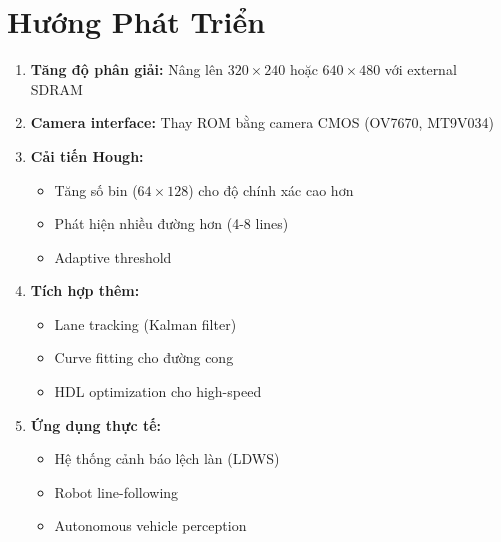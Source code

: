 \documentclass[12pt,a4paper]{report}
\begin{document}
\section{Hướng Phát Triển}

\begin{enumerate}
    \item \textbf{Tăng độ phân giải:} Nâng lên $320\times240$ hoặc $640\times480$ với external SDRAM
    
    \item \textbf{Camera interface:} Thay ROM bằng camera CMOS (OV7670, MT9V034)
    
    \item \textbf{Cải tiến Hough:}
    \begin{itemize}
        \item Tăng số bin ($64\times128$) cho độ chính xác cao hơn
        \item Phát hiện nhiều đường hơn (4-8 lines)
        \item Adaptive threshold
    \end{itemize}
    
    \item \textbf{Tích hợp thêm:}
    \begin{itemize}
        \item Lane tracking (Kalman filter)
        \item Curve fitting cho đường cong
        \item HDL optimization cho high-speed
    \end{itemize}
    
    \item \textbf{Ứng dụng thực tế:}
    \begin{itemize}
        \item Hệ thống cảnh báo lệch làn (LDWS)
        \item Robot line-following
        \item Autonomous vehicle perception
    \end{itemize}
\end{enumerate}
\end{document}
